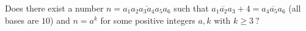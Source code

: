 Does there exist a number $n=\overline{a_1a_2a_3a_4a_5a_6}$ such that $\overline{a_1a_2a_3}+4 = \overline{a_4a_5a_6}$ (all bases are $10$) and $n=a^k$ for some positive integers $a,k$ with $k \geq 3 \ ?$
